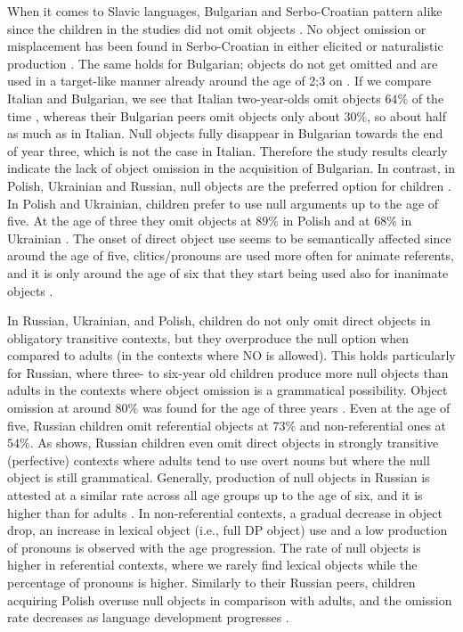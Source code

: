 \documentclass[output=paper,
modfonts,
newtxmath,
hidelinks,
]{langscibook}
\begin{document}
When it comes to Slavic languages, Bulgarian and Serbo-Croatian pattern alike since the children in the studies did not omit objects \citep{Radeva-Bork2013,Radeva-Bork2015,Stiasny2006}. No object omission or misplacement has been found in Serbo-Croatian in either elicited or naturalistic production \citep{Stiasny2006}. The same holds for Bulgarian; objects do not get omitted and are used in a target-like manner already around the age of 2;3 on \citep{Radeva-Bork2015}. If we compare Italian and Bulgarian, we see that Italian two-year-olds omit objects $64\%$ of the time \citep{Schaeffer2000}, whereas their Bulgarian peers omit objects only about $30\%$, so about half as much as in Italian. Null objects fully disappear in Bulgarian towards the end of year three, which is not the case in Italian. Therefore the study results clearly indicate the lack of object omission in the acquisition of Bulgarian. In contrast, in Polish, Ukrainian and Russian, null objects are the preferred option for children \citep{Tryzna2015,Mykhaylyk-Sopata2016,Gordishevsky-Avrutin2004,Frolova2016}. In Polish and Ukrainian, children prefer to use null arguments up to the age of five. At the age of three they omit objects at $89\%$ in Polish and at $68\%$ in Ukrainian \citep{Mykhaylyk-Sopata2016}. The onset of direct object use seems to be semantically affected since around the age of five, clitics/pronouns are used more often for animate referents, and it is only around the age of six that they start being used also for inanimate objects \citep{Mykhaylyk-Sopata2016}.

In Russian, Ukrainian, and Polish, children do not only omit direct objects in obligatory transitive contexts, but they overproduce the null option when compared to adults (in the contexts where NO is allowed). This holds particularly for Russian, where three- to six-year old children produce more null objects than adults in the contexts where object omission is a grammatical possibility. Object omission at around $80\%$ was found for the age of three years \citep{Frolova2016}. Even at the age of five, Russian children omit referential objects at $73\%$ and non-referential ones at $54\%$. As \citet{Frolova} shows, Russian children even omit direct objects in strongly transitive (perfective) contexts where adults tend to use overt nouns but where the null object is still grammatical. Generally, production of null objects in Russian is attested at a similar rate across all age groups up to the age of six, and it is higher than for adults \citep{Frolova2016}. In non-referential contexts, a gradual decrease in object drop, an increase in lexical object (i.e., full DP object) use and a low production of pronouns is observed with the age progression. The rate of null objects is higher in referential contexts, where we rarely find lexical objects while the percentage of pronouns is higher. Similarly to their Russian peers, children acquiring Polish overuse null objects in comparison with adults, and the omission rate decreases as language development progresses \citep{Mykhaylyk-Sopata2016,Tryzna2015}.
\end{document}
